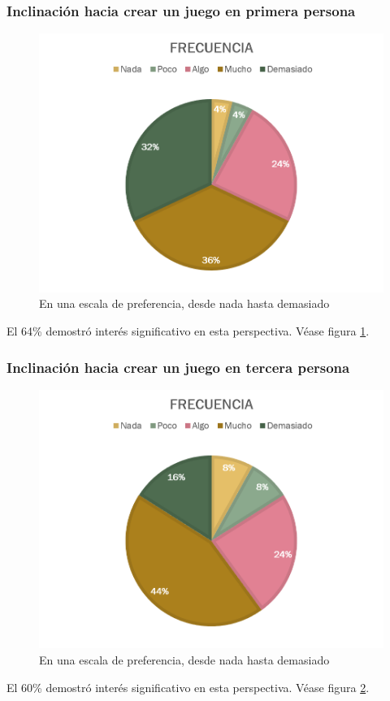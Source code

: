 \documentclass[]{article}
\begin{document}
\subsubsection{Inclinaci\'on hacia crear un juego en primera persona}
\begin{figure}[H]
	
	\centering
	\includegraphics[width=1\textwidth]{Encuesta_tipo_primera}
	\caption{En una escala de preferencia, desde nada hasta demasiado} 
	\label{PRI}
	
\end{figure}
El 64\% demostr\'o inter\'es significativo en esta perspectiva. V\'ease figura \ref{PRI}.
\subsubsection{Inclinaci\'on hacia crear un juego en tercera persona}
\begin{figure}[H]
	
	\centering
	\includegraphics[width=1\textwidth]{Encuesta_tipo_tercera}
	\caption{En una escala de preferencia, desde nada hasta demasiado} 
	\label{TERCERA}
	
\end{figure}
El 60\% demostr\'o inter\'es significativo en esta perspectiva. V\'ease figura \ref{TERCERA}.
\end{document}
